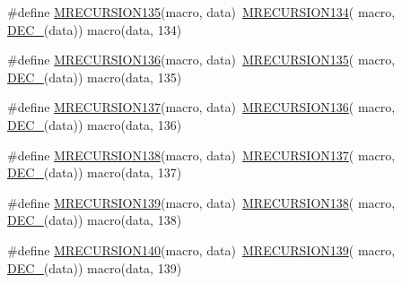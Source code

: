 \begin{DoxyCompactItemize}
\item 
\#define \mbox{\hyperlink{group__group__sam0__utils__mrecursion_ga0ef1de26f3cd3e214e5b96910167f8ec}{M\+R\+E\+C\+U\+R\+S\+I\+O\+N135}}(macro,  data)~\mbox{\hyperlink{group__group__sam0__utils__mrecursion_ga340283014fb8ab457e6a67b1549aa8a1}{M\+R\+E\+C\+U\+R\+S\+I\+O\+N134}}(  macro, \mbox{\hyperlink{group__group__sam0__utils__mrecursion_ga1d23d683797679dca8c3512a54a5dcae}{D\+E\+C\+\_\+}}(data))   macro(data, 134)
\item 
\#define \mbox{\hyperlink{group__group__sam0__utils__mrecursion_ga14dc3ff957489f36ff0edd97c663379b}{M\+R\+E\+C\+U\+R\+S\+I\+O\+N136}}(macro,  data)~\mbox{\hyperlink{group__group__sam0__utils__mrecursion_ga0ef1de26f3cd3e214e5b96910167f8ec}{M\+R\+E\+C\+U\+R\+S\+I\+O\+N135}}(  macro, \mbox{\hyperlink{group__group__sam0__utils__mrecursion_ga1d23d683797679dca8c3512a54a5dcae}{D\+E\+C\+\_\+}}(data))   macro(data, 135)
\item 
\#define \mbox{\hyperlink{group__group__sam0__utils__mrecursion_gab821ae0bbb999d5fd6e068b577603f95}{M\+R\+E\+C\+U\+R\+S\+I\+O\+N137}}(macro,  data)~\mbox{\hyperlink{group__group__sam0__utils__mrecursion_ga14dc3ff957489f36ff0edd97c663379b}{M\+R\+E\+C\+U\+R\+S\+I\+O\+N136}}(  macro, \mbox{\hyperlink{group__group__sam0__utils__mrecursion_ga1d23d683797679dca8c3512a54a5dcae}{D\+E\+C\+\_\+}}(data))   macro(data, 136)
\item 
\#define \mbox{\hyperlink{group__group__sam0__utils__mrecursion_ga77d047e7ca2ab8a69562bd7cd7f62186}{M\+R\+E\+C\+U\+R\+S\+I\+O\+N138}}(macro,  data)~\mbox{\hyperlink{group__group__sam0__utils__mrecursion_gab821ae0bbb999d5fd6e068b577603f95}{M\+R\+E\+C\+U\+R\+S\+I\+O\+N137}}(  macro, \mbox{\hyperlink{group__group__sam0__utils__mrecursion_ga1d23d683797679dca8c3512a54a5dcae}{D\+E\+C\+\_\+}}(data))   macro(data, 137)
\item 
\#define \mbox{\hyperlink{group__group__sam0__utils__mrecursion_ga1de6fa2750176e2d386c0e8e6d937476}{M\+R\+E\+C\+U\+R\+S\+I\+O\+N139}}(macro,  data)~\mbox{\hyperlink{group__group__sam0__utils__mrecursion_ga77d047e7ca2ab8a69562bd7cd7f62186}{M\+R\+E\+C\+U\+R\+S\+I\+O\+N138}}(  macro, \mbox{\hyperlink{group__group__sam0__utils__mrecursion_ga1d23d683797679dca8c3512a54a5dcae}{D\+E\+C\+\_\+}}(data))   macro(data, 138)
\item 
\#define \mbox{\hyperlink{group__group__sam0__utils__mrecursion_gad48f900c9eaf24623bd027ea995b45ad}{M\+R\+E\+C\+U\+R\+S\+I\+O\+N140}}(macro,  data)~\mbox{\hyperlink{group__group__sam0__utils__mrecursion_ga1de6fa2750176e2d386c0e8e6d937476}{M\+R\+E\+C\+U\+R\+S\+I\+O\+N139}}(  macro, \mbox{\hyperlink{group__group__sam0__utils__mrecursion_ga1d23d683797679dca8c3512a54a5dcae}{D\+E\+C\+\_\+}}(data))   macro(data, 139)

\end{DoxyCompactItemize}
